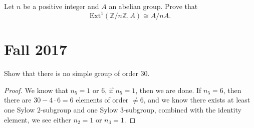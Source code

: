 \documentclass[openany]{book}
\begin{document}
\begin{prob}
    Let \(n\) be a positive integer and \(A\) an abelian group. Prove that
    \[\text{Ext}^1(\mathbb{Z}/n\mathbb{Z}, A) \cong A/nA.\]
\end{prob}





\chapter{Fall 2017}


\begin{prob}
    Show that there is no simple group of order 30.
\end{prob}
\begin{proof}
    We know that $n_5=1$ or $6$, if $n_5=1$, then we are done. If $n_5=6$, then there are $30-4\cdot 6=6$ elements of order $\neq 6$, and we know there exists at least one Sylow $2$-subgroup and one Sylow $3$-subgroup, combined with the identity element, we see either $n_2=1$ or $n_3=1$. 
\end{proof}
\end{document}
